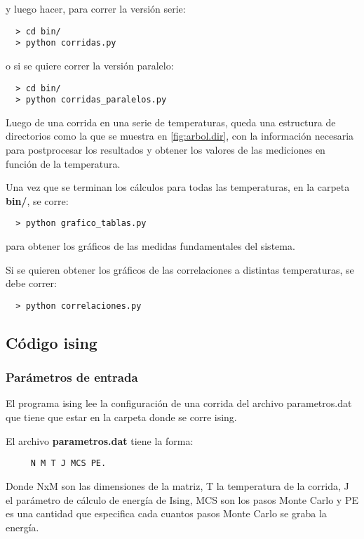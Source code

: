 y luego hacer, para correr la versión serie:

\begin{verbatim}
  > cd bin/
  > python corridas.py
\end{verbatim}

o si se quiere correr la versión paralelo:

\begin{verbatim}
  > cd bin/
  > python corridas_paralelos.py
\end{verbatim}

Luego de una corrida en una serie de temperaturas, queda una estructura de directorios
como la que se muestra en \ref{fig:arbol.dir}, con la información necesaria para postprocesar
los resultados y obtener los valores de las mediciones en función de la temperatura.

Una vez que se terminan los cálculos para todas las temperaturas,  en 
la carpeta \textbf{bin/}, se corre:

\begin{verbatim}
  > python grafico_tablas.py 
\end{verbatim}

para obtener los gráficos de las medidas fundamentales del sistema.

Si se quieren obtener los gráficos de las correlaciones a distintas temperaturas, 
se debe correr:

\begin{verbatim}
  > python correlaciones.py 
\end{verbatim}



\subsection{C\'odigo ising}

\subsubsection{Par\'ametros de entrada}

El programa ising lee la configuraci\'on de una corrida del 
archivo parametros.dat que tiene que estar en la carpeta donde se
corre ising.

El archivo \textbf{parametros.dat} tiene la forma: 

\begin{verbatim}
     N M T J MCS PE. 
\end{verbatim}

Donde NxM 
son las dimensiones de la matriz, T la temperatura de la corrida,
J el par\'ametro de c\'alculo de energ\'ia de Ising, MCS son los pasos Monte Carlo y PE
es una cantidad que especifica cada cuantos pasos Monte Carlo se graba la energ\'ia.

